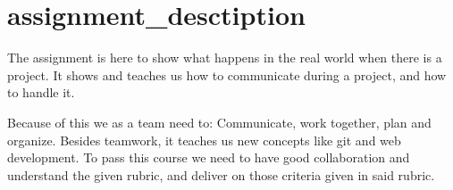 \section{assignment\_desctiption}

The assignment is here to show what happens in the real world when there is a project.
It shows and teaches us how to communicate during a project, and how to handle it.

Because of this we as a team need to: Communicate, work together, plan and organize.
Besides teamwork, it teaches us new concepts like git and web development.
To pass this course we need to have good collaboration and understand the given rubric, and deliver on those criteria given in said rubric.
